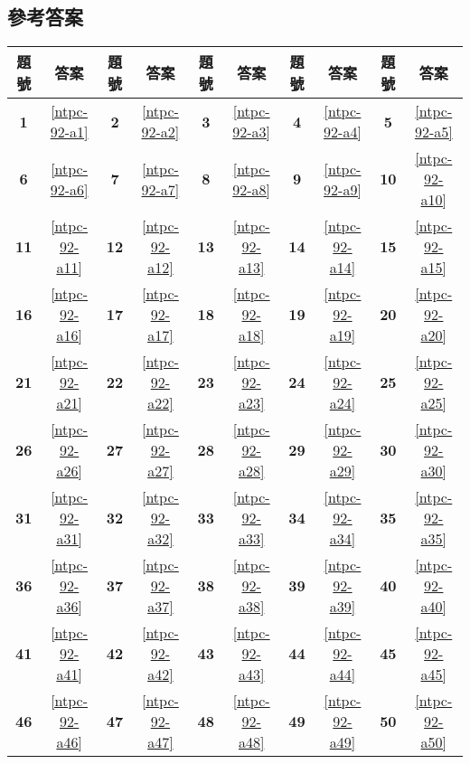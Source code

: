 \documentclass[12pt,a4paper]{report}
\begin{document}
\begin{CJK}{UTF8}{bkai}
\newpage

\section*{參考答案}

\begin{table}[h]
  \center
  \begin{tabular}{|c|c|c|c|c|c|c|c|c|c|}
  \hline
  題號 & 答案 & 題號 & 答案 & 題號 & 答案 & 題號 & 答案 & 題號 & 答案\\
  \hline\hline
  \textbf{1}  & \ref{ntpc-92-a1} & \textbf{2}  & \ref{ntpc-92-a2} & \textbf{3}  & \ref{ntpc-92-a3} & \textbf{4}  & \ref{ntpc-92-a4} & \textbf{5}  & \ref{ntpc-92-a5}\\
  \hline
  \textbf{6}  & \ref{ntpc-92-a6} & \textbf{7}  & \ref{ntpc-92-a7} & \textbf{8}  & \ref{ntpc-92-a8} & \textbf{9}  & \ref{ntpc-92-a9} & \textbf{10} & \ref{ntpc-92-a10}\\
  \hline
  \textbf{11} & \ref{ntpc-92-a11} & \textbf{12} & \ref{ntpc-92-a12} & \textbf{13} & \ref{ntpc-92-a13} & \textbf{14} & \ref{ntpc-92-a14} & \textbf{15} & \ref{ntpc-92-a15}\\
  \hline
  \textbf{16} & \ref{ntpc-92-a16} & \textbf{17} & \ref{ntpc-92-a17} & \textbf{18} & \ref{ntpc-92-a18} & \textbf{19} & \ref{ntpc-92-a19} & \textbf{20} & \ref{ntpc-92-a20}\\
  \hline
  \textbf{21} & \ref{ntpc-92-a21} & \textbf{22} & \ref{ntpc-92-a22} & \textbf{23} & \ref{ntpc-92-a23} & \textbf{24} & \ref{ntpc-92-a24} & \textbf{25} & \ref{ntpc-92-a25}\\
  \hline
  \textbf{26} & \ref{ntpc-92-a26} & \textbf{27} & \ref{ntpc-92-a27} & \textbf{28} & \ref{ntpc-92-a28} & \textbf{29} & \ref{ntpc-92-a29} & \textbf{30} & \ref{ntpc-92-a30}\\
  \hline
  \textbf{31} & \ref{ntpc-92-a31} & \textbf{32} & \ref{ntpc-92-a32} & \textbf{33} & \ref{ntpc-92-a33} & \textbf{34} & \ref{ntpc-92-a34} & \textbf{35} & \ref{ntpc-92-a35}\\
  \hline
  \textbf{36} & \ref{ntpc-92-a36} & \textbf{37} & \ref{ntpc-92-a37} & \textbf{38} & \ref{ntpc-92-a38} & \textbf{39} & \ref{ntpc-92-a39} & \textbf{40} & \ref{ntpc-92-a40}\\
  \hline
  \textbf{41} & \ref{ntpc-92-a41} & \textbf{42} & \ref{ntpc-92-a42} & \textbf{43} & \ref{ntpc-92-a43} & \textbf{44} & \ref{ntpc-92-a44} & \textbf{45} & \ref{ntpc-92-a45}\\
  \hline
  \textbf{46} & \ref{ntpc-92-a46} & \textbf{47} & \ref{ntpc-92-a47} & \textbf{48} & \ref{ntpc-92-a48} & \textbf{49} & \ref{ntpc-92-a49} & \textbf{50} & \ref{ntpc-92-a50}\\
  \hline
  \end{tabular}
\end{table}

\end{CJK}
\end{document}
